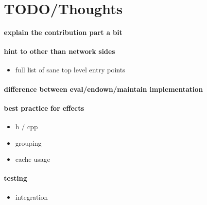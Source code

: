 \documentclass{tufte-handout}
\begin{document}
\section{TODO/Thoughts}

\paragraph{explain the contribution part a bit}

\paragraph{hint to other than network sides}

\begin{itemize}
\item full list of sane top level entry points
\end{itemize}

\paragraph{difference between eval/endown/maintain implementation}

\paragraph{best practice for effects}

\begin{itemize}
\item h / cpp
\item grouping
\item cache usage
\end{itemize}

\paragraph{testing}

\begin{itemize}
\item integration
\end{itemize}
\end{document}
